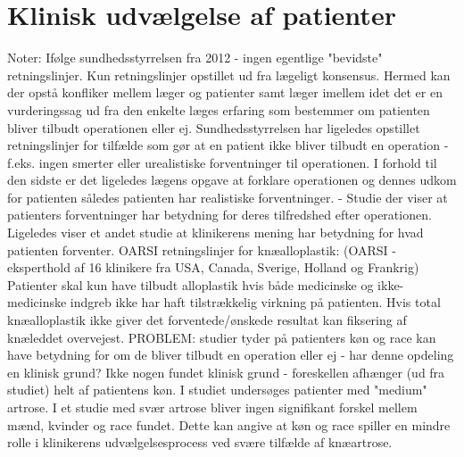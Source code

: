 \section{Klinisk udvælgelse af patienter}

Noter: 
Ifølge sundhedsstyrrelsen fra 2012 - ingen egentlige "bevidste" retningslinjer. Kun retningslinjer opstillet ud fra lægeligt konsensus. Hermed kan der opstå konfliker mellem læger og patienter samt læger imellem idet det er en vurderingssag ud fra den enkelte læges erfaring som bestemmer om patienten bliver tilbudt operationen eller ej. 
Sundhedsstyrrelsen har ligeledes opstillet retningslinjer for tilfælde som gør at en patient ikke bliver tilbudt en operation - f.eks. ingen smerter eller urealistiske forventninger til operationen. I forhold til den sidste er det ligeledes lægens opgave at forklare operationen og dennes udkom for patienten således patienten har realistiske forventninger. - Studie der viser at patienters forventninger har betydning for deres tilfredshed efter operationen. Ligeledes viser et andet studie at klinikerens mening har betydning for hvad patienten forventer. 
OARSI retningslinjer for knæalloplastik: (OARSI - eksperthold af 16 klinikere fra USA, Canada, Sverige, Holland og Frankrig)
Patienter skal kun have tilbudt alloplastik hvis både medicinske og ikke-medicinske indgreb ikke har haft tilstrækkelig virkning på patienten. 
Hvis total knæalloplastik ikke giver det forventede/ønskede resultat kan fiksering af knæleddet overvejest. 
PROBLEM: studier tyder på patienters køn og race kan have betydning for om de bliver tilbudt en operation eller ej - har denne opdeling en klinisk grund? Ikke nogen fundet klinisk grund - foreskellen afhænger (ud fra studiet) helt af patientens køn. I studiet undersøges patienter med "medium" artrose. I et studie med svær artrose bliver ingen signifikant forskel mellem mænd, kvinder og race fundet. Dette kan angive at køn og race spiller en mindre rolle i klinikerens udvælgelsesprocess ved svære tilfælde af knæartrose. 



